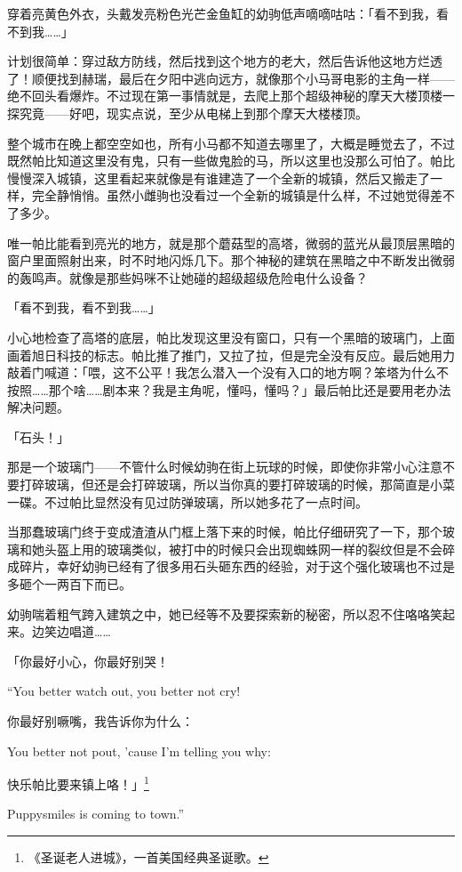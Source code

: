 穿着亮黄色外衣，头戴发亮粉色光芒金鱼缸的幼驹低声嘀嘀咕咕：「看不到我，看不到我……」

计划很简单：穿过敌方防线，然后找到这个地方的老大，然后告诉他这地方烂透了！顺便找到赫瑞，最后在夕阳中逃向远方，就像那个小马哥电影的主角一样——绝不回头看爆炸。不过现在第一事情就是，去爬上那个超级神秘的摩天大楼顶楼一探究竟——好吧，现实点说，至少从电梯上到那个摩天大楼楼顶。

整个城市在晚上都空空如也，所有小马都不知道去哪里了，大概是睡觉去了，不过既然帕比知道这里没有鬼，只有一些做鬼脸的马，所以这里也没那么可怕了。帕比慢慢深入城镇，这里看起来就像是有谁建造了一个全新的城镇，然后又搬走了一样，完全静悄悄。虽然小雌驹也没看过一个全新的城镇是什么样，不过她觉得差不了多少。

唯一帕比能看到亮光的地方，就是那个蘑菇型的高塔，微弱的蓝光从最顶层黑暗的窗户里面照射出来，时不时地闪烁几下。那个神秘的建筑在黑暗之中不断发出微弱的轰鸣声。就像是那些妈咪不让她碰的超级超级危险电什么设备？

「看不到我，看不到我……」

小心地检查了高塔的底层，帕比发现这里没有窗口，只有一个黑暗的玻璃门，上面画着旭日科技的标志。帕比推了推门，又拉了拉，但是完全没有反应。最后她用力敲着门喊道：「喂，这不公平！我怎么潜入一个没有入口的地方啊？笨塔为什么不按照……那个啥……剧本来？我是主角呢，懂吗，懂吗？」最后帕比还是要用老办法解决问题。

「石头！」

那是一个玻璃门——不管什么时候幼驹在街上玩球的时候，即使你非常小心注意不要打碎玻璃，但还是会打碎玻璃，所以当你真的要打碎玻璃的时候，那简直是小菜一碟。不过帕比显然没有见过防弹玻璃，所以她多花了一点时间。

当那蠢玻璃门终于变成渣渣从门框上落下来的时候，帕比仔细研究了一下，那个玻璃和她头盔上用的玻璃类似，被打中的时候只会出现蜘蛛网一样的裂纹但是不会碎成碎片，幸好幼驹已经有了很多用石头砸东西的经验，对于这个强化玻璃也不过是多砸个一两百下而已。

幼驹喘着粗气跨入建筑之中，她已经等不及要探索新的秘密，所以忍不住咯咯笑起来。边笑边唱道……

\begin{song}
「你最好小心，你最好别哭！


\begin{englishlyric}
    ``You better watch out, you better not cry!
\end{englishlyric}

\medskip

你最好别噘嘴，我告诉你为什么：


\begin{englishlyric}
    You better not pout, 'cause I'm telling you why:
\end{englishlyric}

\medskip

快乐帕比要来镇上咯！」\footnotespacefix\footnote{《圣诞老人进城》，一首美国经典圣诞歌。}


\begin{englishlyric}
    Puppysmiles is coming to town.''
\end{englishlyric}
\end{song}

